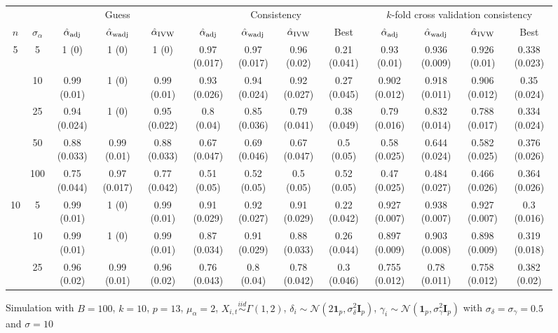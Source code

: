\documentclass[10pt]{article}
\newcommand{\simiid}{\stackrel{iid}{\sim}} %
\def\normal#1#2{\mathcal{N}(#1,#2)} %
\theoremstyle{definition}
\begin{document}
\begin{sidewaysfigure}
\centering
\caption{Simulation  with $B = 100$, $k = 10$, $p = 13$, $\mu_{\alpha}=2$, $X_{i,t} \simiid \Gamma(1,2)$, $\delta_i \sim \normal{2\mathbf{1}_p}{\sigma^2_{\delta}\mathbf{I}_p}$, $\gamma_i \sim \normal{\mathbf{1}_p}{\sigma^2_{\gamma}\mathbf{I}_p}$ with $\sigma_{\delta}=\sigma_{\gamma}=0.5$ and $\sigma = 10$}
\begin{tabular}{cc|ccc|cccc|cccc}
   &   & \multicolumn{3}{|c|}{Guess} & \multicolumn{4}{|c|}{Consistency}  & \multicolumn{4}{|c|}{$k$-fold cross validation consistency} \\ 
 $n$   & $\sigma_{\alpha}$ &  $\hat{\alpha}_{\rm adj}$  & $\hat{\alpha}_{\rm wadj}$ & $\hat{\alpha}_{\rm IVW}$ & $\hat{\alpha}_{\rm adj}$  & $\hat{\alpha}_{\rm wadj}$ & $\hat{\alpha}_{\rm IVW}$ &  Best & $\hat{\alpha}_{\rm adj}$  & $\hat{\alpha}_{\rm wadj}$ & $\hat{\alpha}_{\rm IVW}$ &  Best \\[.3cm]  
  \hline
  \multirow{5}{*}{5}  & 5  & 1 (0) & 1 (0) & 1 (0) & 0.97 (0.017) & 0.97 (0.017) & 0.96 (0.02) & 0.21 (0.041) & 0.93 (0.01) & 0.936 (0.009) & 0.926 (0.01) & 0.338 (0.023) \\ 
    & 10  & 0.99 (0.01) & 1 (0) & 0.99 (0.01) & 0.93 (0.026) & 0.94 (0.024) & 0.92 (0.027) & 0.27 (0.045) & 0.902 (0.012) & 0.918 (0.011) & 0.906 (0.012) & 0.35 (0.024) \\ 
    & 25  & 0.94 (0.024) & 1 (0) & 0.95 (0.022) & 0.8 (0.04) & 0.85 (0.036) & 0.79 (0.041) & 0.38 (0.049) & 0.79 (0.016) & 0.832 (0.014) & 0.788 (0.017) & 0.334 (0.024) \\ 
    & 50  & 0.88 (0.033) & 0.99 (0.01) & 0.88 (0.033) & 0.67 (0.047) & 0.69 (0.046) & 0.67 (0.047) & 0.5 (0.05) & 0.58 (0.025) & 0.644 (0.024) & 0.582 (0.025) & 0.376 (0.026) \\ 
    & 100  & 0.75 (0.044) & 0.97 (0.017) & 0.77 (0.042) & 0.51 (0.05) & 0.52 (0.05) & 0.5 (0.05) & 0.52 (0.05) & 0.47 (0.025) & 0.484 (0.027) & 0.466 (0.026) & 0.364 (0.026) \\[.3cm]  
    \multirow{5}{*}{10}  & 5  & 0.99 (0.01) & 1 (0) & 0.99 (0.01) & 0.91 (0.029) & 0.92 (0.027) & 0.91 (0.029) & 0.22 (0.042) & 0.927 (0.007) & 0.938 (0.007) & 0.927 (0.007) & 0.3 (0.016) \\ 
    & 10  & 0.99 (0.01) & 1 (0) & 0.99 (0.01) & 0.87 (0.034) & 0.91 (0.029) & 0.88 (0.033) & 0.26 (0.044) & 0.897 (0.009) & 0.903 (0.008) & 0.898 (0.009) & 0.319 (0.018) \\ 
    & 25  & 0.96 (0.02) & 0.99 (0.01) & 0.96 (0.02) & 0.76 (0.043) & 0.8 (0.04) & 0.78 (0.042) & 0.3 (0.046) & 0.755 (0.012) & 0.78 (0.011) & 0.758 (0.012) & 0.382 (0.02) \\ 

\end{tabular}
\end{sidewaysfigure}
\end{document}
